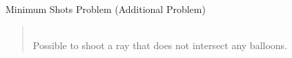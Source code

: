 
\begin{frame}{}
  \begin{exampleblock}{Minimum Shots Problem (Additional Problem)}
  \end{exampleblock}

  \pause
  \vspace{0.50cm}
  \begin{quote}
    \centering
     \\[6pt]
    {\large Possible to shoot a ray that does not intersect any balloons.}
  \end{quote}
\end{frame}

\begin{frame}{}
\end{frame}
